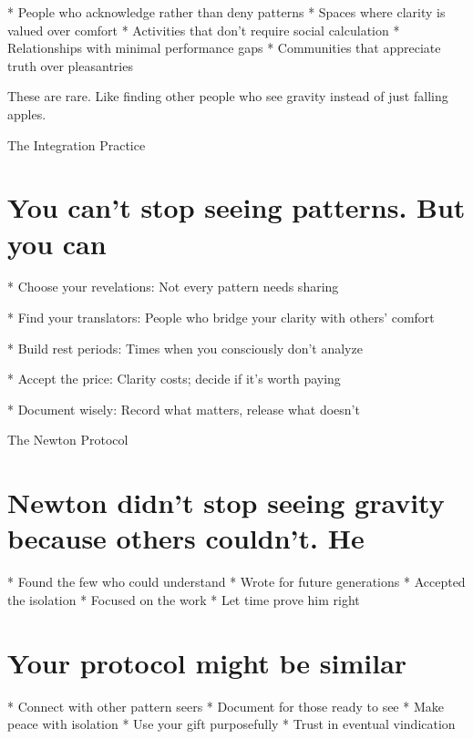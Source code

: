 \documentclass[12pt,oneside]{book}
\begin{document}
                    * People who acknowledge rather than deny patterns
                    * Spaces where clarity is valued over comfort
                    * Activities that don't require social calculation
                    * Relationships with minimal performance gaps
                    * Communities that appreciate truth over pleasantries

These are rare. Like finding other people who see gravity instead of just falling apples.

The Integration Practice

\section{You can't stop seeing patterns. But you can}

                    * Choose your revelations: Not every pattern needs sharing

                    * Find your translators: People who bridge your clarity with others' comfort

                    * Build rest periods: Times when you consciously don't analyze

                    * Accept the price: Clarity costs; decide if it's worth paying

                    * Document wisely: Record what matters, release what doesn't

The Newton Protocol

\section{Newton didn't stop seeing gravity because others couldn't. He}

                    * Found the few who could understand
                    * Wrote for future generations
                    * Accepted the isolation
                    * Focused on the work
                    * Let time prove him right

\section{Your protocol might be similar}

                    * Connect with other pattern seers
                    * Document for those ready to see
                    * Make peace with isolation
                    * Use your gift purposefully
                    * Trust in eventual vindication
\end{document}
